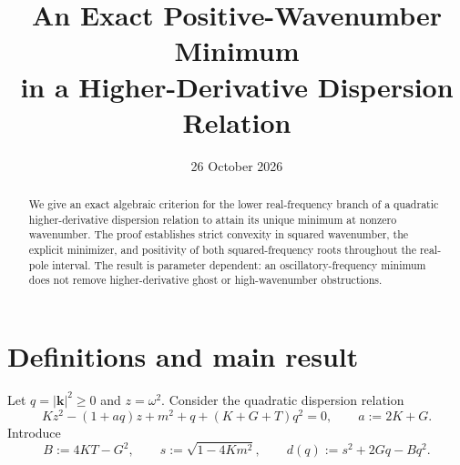\documentclass[11pt]{article}
\title{An Exact Positive-Wavenumber Minimum\\in a Higher-Derivative Dispersion Relation}
\author{}
\date{26 October 2026}
\begin{document}
\maketitle

\begin{abstract}
We give an exact algebraic criterion for the lower real-frequency branch
of a quadratic higher-derivative dispersion relation to attain its unique
minimum at nonzero wavenumber.  The proof establishes strict convexity in
squared wavenumber, the explicit minimizer, and positivity of both
squared-frequency roots throughout the real-pole interval.  The result is
parameter dependent: an oscillatory-frequency minimum does not remove
higher-derivative ghost or high-wavenumber obstructions.
\end{abstract}

\section{Definitions and main result}
Let $q=|\mathbf{k}|^2\geq 0$ and $z=\omega^2$.  Consider the quadratic
dispersion relation
\begin{equation}\label{eq:dispersion}
 K z^2-(1+a q)z+m^2+q+(K+G+T)q^2=0,
 \qquad a:=2K+G.
\end{equation}
Introduce
\begin{equation}\label{eq:defs}
 B:=4KT-G^2,\qquad
 s:=\sqrt{1-4Km^2},\qquad
 d(q):=s^2+2Gq-Bq^2.
\end{equation}
\end{document}
